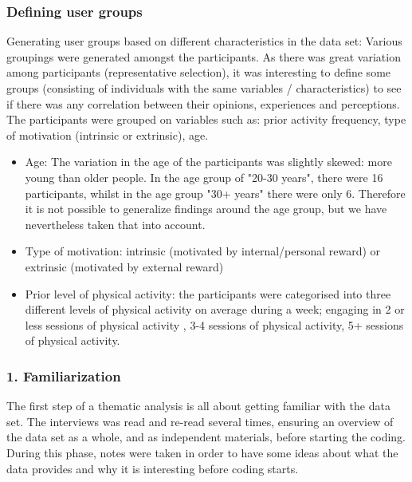     \subsubsection{Defining user groups}
    Generating user groups based on different characteristics in the data set: Various groupings were generated amongst the participants. As there was great variation among participants (representative selection), it was interesting to define some groups (consisting of individuals with the same variables / characteristics) to see if there was any correlation between their opinions, experiences and perceptions. The participants were grouped on variables such as: prior activity frequency, type of motivation (intrinsic or extrinsic), age.
    
\begin{itemize}
\item Age: The variation in the age of the participants was slightly skewed: more young than older people. In the age group of "20-30 years", there were 16 participants, whilst in the age group "30+ years" there were only 6. Therefore it is not possible to generalize findings around the age group, but we have nevertheless taken that into account.
\item     Type of motivation: intrinsic (motivated by internal/personal reward) or extrinsic (motivated by external reward)
\item     Prior level of physical activity: the participants were categorised into three different levels of physical activity on average during a week; engaging in 2 or less sessions of physical activity , 3-4 sessions of physical activity, 5+ sessions of physical activity. 
\end{itemize}
    
    \subsubsection{1. Familiarization}
    The first step of a thematic analysis is all about getting familiar with the data set. The interviews was read and re-read several times, ensuring an overview of the data set as a whole, and as independent materials, before starting the coding. During this phase, notes were taken in order to have some ideas about what the data provides and why it is interesting before coding starts.
    
